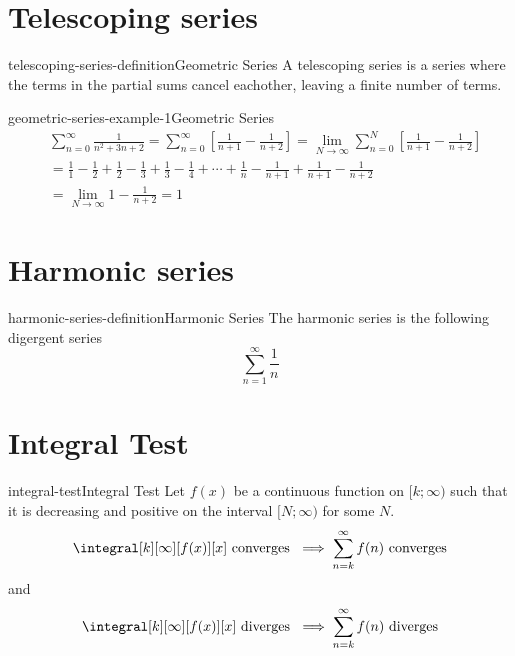 \documentclass[preview]{standalone}
\begin{document}
\section{Telescoping series}

\begin{snippetdefinition}{telescoping-series-definition}{Geometric Series}
    A telescoping series is a series where the terms in the partial sums cancel eachother,
    leaving a finite number of terms.
\end{snippetdefinition}

\begin{snippetexample}{geometric-series-example-1}{Geometric Series}
    \begin{align*}
        &\sum_{n=0}^\infty \frac{1}{n^2 + 3n + 2}
        = \sum_{n=0}^\infty \left[ \frac{1}{n+1} - \frac{1}{n+2} \right]
        = \lim_{N \to \infty} \sum_{n=0}^N \left[ \frac{1}{n+1} - \frac{1}{n+2} \right] \\
        &= \frac{1}{1} - \frac{1}{2} + \frac{1}{2} - \frac{1}{3}
        + \frac{1}{3} - \frac{1}{4} + \cdots + \frac{1}{n} - \frac{1}{n+1} +
        \frac{1}{n+1} - \frac{1}{n+2} \\
        &= \lim_{N \to \infty} 1 - \frac{1}{n+2} = 1
    \end{align*}
\end{snippetexample}

\section{Harmonic series}

\begin{snippetdefinition}{harmonic-series-definition}{Harmonic Series}
    The harmonic series is the following digergent series
    \[
        \sum_{n=1}^\infty \frac{1}{n}
    \]
\end{snippetdefinition}

\section{Integral Test}

\begin{snippetdefinition}{integral-test}{Integral Test}
    Let \(f(x)\) be a continuous function on \([k;\infty)\)
    such that it is decreasing and positive on the interval \([N; \infty)\)
    for some \(N\).
    \[
        \integral[k][\infty][f(x)][x] \text{ converges } \implies
        \sum_{n=k}^{\infty} f(n) \text{ converges}
    \]
    and
    \[
        \integral[k][\infty][f(x)][x] \text{ diverges } \implies
        \sum_{n=k}^{\infty} f(n) \text{ diverges}
    \]
\end{snippetdefinition}
\end{document}
